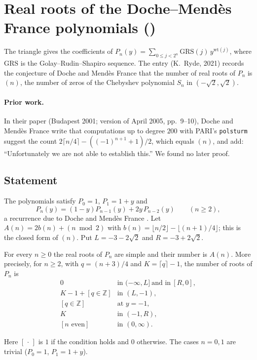 \section{Real roots of the Doche--Mend\`es France polynomials ()}\label{s:A347171}
The triangle  gives the coefficients of $P_n(y)=\sum_{0\le j<2^n}\mathrm{GRS}(j)\,y^{\mathrm{wt}(j)}$, where $\mathrm{GRS}$ is the Golay--Rudin--Shapiro sequence. The entry (K.~Ryde, 2021) records the conjecture of Doche and Mend\`es France that the number of real roots of $P_n$ is $(n)$, the number of zeros of the Chebyshev polynomial $S_n$ in $(-\sqrt2,\sqrt2)$.

\paragraph{Prior work.} In their paper (Budapest 2001; version of April 2005, pp.~9--10), Doche and Mend\`es France
write that computations up to degree $200$ with PARI's \texttt{polsturm} suggest the count
$2\lceil n/4\rceil-((-1)^{n+1}+1)/2$, which equals $(n)$, and add: ``Unfortunately we are not able to
establish this.'' We found no later proof.

\subsection{Statement}
The polynomials satisfy $P_0=1$, $P_1=1+y$ and
\begin{equation}\label{e:grsrec}
P_n(y)=(1-y)P_{n-1}(y)+2y\,P_{n-2}(y)\qquad(n\ge2),
\end{equation}
a recurrence due to Doche and Mend\`es France \cite{DMF}. Let
$A(n)=2b(n)+(n \bmod 2)$ with $b(n)=\lfloor n/2\rfloor-\lfloor (n+1)/4\rfloor$; this is the closed form of
$(n)$. Put $L=-3-2\sqrt2$ and $R=-3+2\sqrt2$.

\begin{theorem}\label{t:A347171}
For every $n\ge0$ the real roots of $P_n$ are simple and their number is $A(n)$. More precisely, for
$n\ge2$, with $q=(n+3)/4$ and $K=\lceil q\rceil-1$, the number of roots of $P_n$ is
\[
\begin{array}{ll}
0 & \text{in } (-\infty,L]\ \text{and in}\ [R,0],\\
K-1+[q\in\mathbb Z] & \text{in } (L,-1),\\
{}[q\in\mathbb Z] & \text{at } y=-1,\\
K & \text{in } (-1,R),\\
{}[n \text{ even}] & \text{in } (0,\infty).
\end{array}
\]
\end{theorem}
\noindent Here $[\,\cdot\,]$ is $1$ if the condition holds and $0$ otherwise. The cases $n=0,1$ are trivial
($P_0=1$, $P_1=1+y$).


